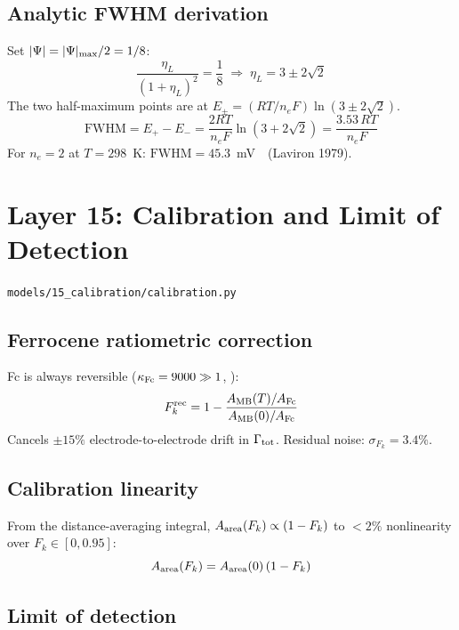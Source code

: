 \documentclass[10pt,a4paper]{article}
\numberwithin{equation}{section}
\newcommand{\CONF}{\textcolor{teal}{\checkmark}}
\newcommand{\file}[1]{\texttt{\small #1}}
\newcommand{\Fk}{F_k}
\newcommand{\Grtot}{\Gamma_{\rm tot}}
\begin{document}
\subsection{Analytic FWHM derivation}

Set $|\Psi| = |\Psi|_{\rm max}/2 = 1/8$:
\begin{equation}
  \frac{\eta_L}{(1+\eta_L)^2} = \frac{1}{8}
  \;\Rightarrow\;
  \eta_L = 3\pm2\sqrt{2}
\end{equation}
The two half-maximum points are at $E_\pm = (RT/n_eF)\ln(3\pm2\sqrt{2})$.
\begin{equation}
  \text{FWHM} = E_+ - E_- = \frac{2RT}{n_eF}\ln(3+2\sqrt{2})
  = \frac{3.53\,RT}{n_eF}
\end{equation}
For $n_e=2$ at $T=298$~K: $\text{FWHM} = 45.3$~mV~\CONF\ (Laviron 1979).

\section{Layer 15: Calibration and Limit of Detection}
\file{models/15\_calibration/calibration.py}

\subsection{Ferrocene ratiometric correction}

Fc is always reversible ($\kappa_{\rm Fc} = 9000\gg1$, \CONF):
\begin{equation}
  F_k^{\rm rec} = 1 - \frac{A_{\rm MB}(T)/A_{\rm Fc}}{A_{\rm MB}(0)/A_{\rm Fc}}
\end{equation}
Cancels $\pm15\%$ electrode-to-electrode drift in $\Grtot$.
Residual noise: $\sigma_{F_k} = 3.4\%$.

\subsection{Calibration linearity}

From the distance-averaging integral, $A_{\rm area}(\Fk) \propto (1-F_k)$
to $<2\%$ nonlinearity over $F_k\in[0,0.95]$:
\begin{equation}
  A_{\rm area}(F_k) = A_{\rm area}(0)\,(1-F_k)
\end{equation}

\subsection{Limit of detection}
\end{document}
